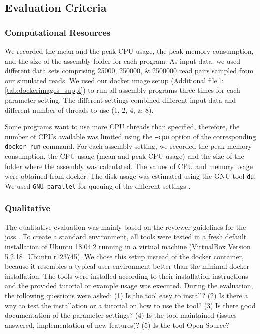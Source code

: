 \documentclass{bmcart}
\newcommand{\crefsupp}[1]{Additional file\,1: \cref{#1}}
\begin{document}
\subsection*{Evaluation Criteria}
\subsubsection*{Computational Resources}
We recorded the mean and the peak CPU usage, the peak memory consumption, and the size of the assembly folder for each program. 
As input data, we used different data sets comprising \numlist{25000;250000;2500000} read pairs sampled from  our simulated reads.
We used our docker image setup (\crefsupp{tab:dockerimages_suppl}) to run all assembly programs three times for each parameter setting.
The different settings combined different input data and different number of threads to use (\numlist{1;2;4;8}).

Some programs want to use more CPU threads than specified, therefore, the number of CPUs available was limited using the \texttt{--cpu} option of the corresponding \texttt{docker run} command.
For each assembly setting, we recorded the peak memory consumption, the CPU usage (mean and peak CPU usage) and the size of the folder where the assembly was calculated.
The values of CPU and memory usage were obtained from docker.
The disk usage was estimated using the GNU tool \texttt{du}.
We used \texttt{GNU parallel} for queuing of the different settings \cite{Tange2011a}.

\subsubsection*{Qualitative}
The qualitative evaluation was mainly based on the reviewer guidelines for the \gls{joss} \cite{joss}.
To create a standard environment, all tools were tested in a fresh default installation of Ubuntu 18.04.2 running in a virtual machine (VirtualBox Version 5.2.18\_Ubuntu r123745).
We chose this setup instead of the docker container, because it resembles a typical user environment better than the minimal docker installation.
The tools were installed according to their installation instructions and the provided tutorial or example usage was executed.
During the evaluation, the following questions were asked:
(1) Is the tool easy to install?
(2) Is there a way to test the installation or a tutorial on how to use the tool?
(3) Is there good documentation of the parameter settings? 
(4) Is the tool maintained (issues answered, implementation of new features)?
(5) Is the tool Open Source?
\end{document}

